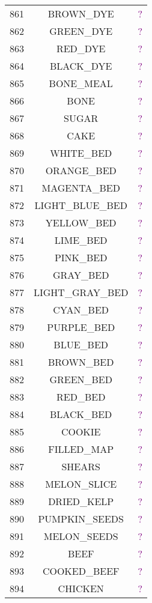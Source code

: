\documentclass[11pt]{article}
\newcommand\myworries[1]{\textcolor{purple}{#1}}
\begin{document}
\begin{longtable}{ |c|c|c| }
	861 & BROWN\_DYE & \myworries{?} \\
	862 & GREEN\_DYE & \myworries{?} \\
	863 & RED\_DYE & \myworries{?} \\
	864 & BLACK\_DYE & \myworries{?} \\
	865 & BONE\_MEAL & \myworries{?} \\
	866 & BONE & \myworries{?} \\
	867 & SUGAR & \myworries{?} \\
	868 & CAKE & \myworries{?} \\
	869 & WHITE\_BED & \myworries{?} \\
	870 & ORANGE\_BED & \myworries{?} \\
	871 & MAGENTA\_BED & \myworries{?} \\
	872 & LIGHT\_BLUE\_BED & \myworries{?} \\
	873 & YELLOW\_BED & \myworries{?} \\
	874 & LIME\_BED & \myworries{?} \\
	875 & PINK\_BED & \myworries{?} \\
	876 & GRAY\_BED & \myworries{?} \\
	877 & LIGHT\_GRAY\_BED & \myworries{?} \\
	878 & CYAN\_BED & \myworries{?} \\
	879 & PURPLE\_BED & \myworries{?} \\
	880 & BLUE\_BED & \myworries{?} \\
	881 & BROWN\_BED & \myworries{?} \\
	882 & GREEN\_BED & \myworries{?} \\
	883 & RED\_BED & \myworries{?} \\
	884 & BLACK\_BED & \myworries{?} \\
	885 & COOKIE & \myworries{?} \\
	886 & FILLED\_MAP & \myworries{?} \\
	887 & SHEARS & \myworries{?} \\
	888 & MELON\_SLICE & \myworries{?} \\
	889 & DRIED\_KELP & \myworries{?} \\
	890 & PUMPKIN\_SEEDS & \myworries{?} \\
	891 & MELON\_SEEDS & \myworries{?} \\
	892 & BEEF & \myworries{?} \\
	893 & COOKED\_BEEF & \myworries{?} \\
	894 & CHICKEN & \myworries{?} \\

\end{longtable}
\end{document}
